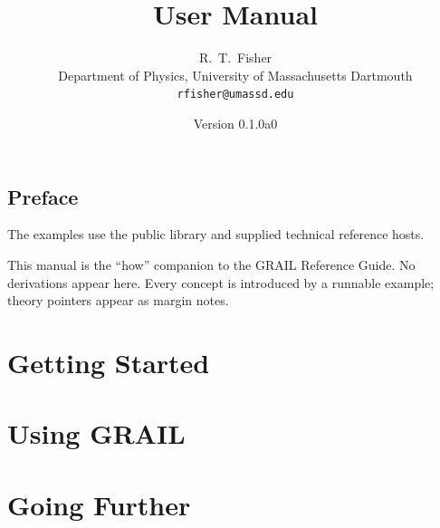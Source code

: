 \documentclass[11pt]{book}
\title{User Manual}
\author{R.~T.~Fisher\\
  {\small Department of Physics, University of Massachusetts Dartmouth}\\
  {\small \texttt{rfisher@umassd.edu}}}
\date{Version 0.1.0a0}
\begin{document}
\sloppy

\frontmatter


\tableofcontents

\chapter*{Preface}

The examples use the public library and supplied technical reference hosts.

This manual is the ``how'' companion to the GRAIL Reference Guide.
No derivations appear here. Every concept is introduced by a runnable
example; theory pointers appear as margin notes.

\mainmatter

\part{Getting Started}







\part{Using GRAIL}







\part{Going Further}
\end{document}

